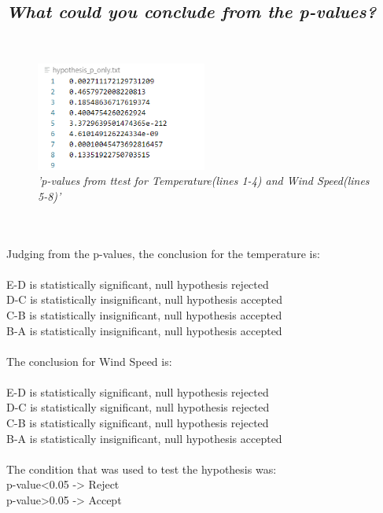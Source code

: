 \documentclass[a4paper,12pt]{article} %
\begin{document}
\subsection{\it What could you conclude from the p-values?}
\\
\begin{figure}[H]
\centering
\includegraphics[width=0.5\textwidth]{Graphs/Pvalues_95pr_ttest_TEMP_WS.PNG}
\caption{\it'p-values from ttest for Temperature(lines 1-4) and Wind Speed(lines 5-8)'}
\end{figure}
\\\\
Judging from the p-values, the conclusion for the temperature is:\\\\
E-D is statistically significant, null hypothesis rejected\\
D-C is statistically insignificant, null hypothesis accepted\\
C-B is statistically insignificant, null hypothesis accepted\\
B-A is statistically insignificant, null hypothesis accepted\\\\
The conclusion for Wind Speed is:\\\\
E-D is statistically significant, null hypothesis rejected\\
D-C is statistically significant, null hypothesis rejected\\
C-B is statistically significant, null hypothesis rejected\\
B-A is statistically insignificant, null hypothesis accepted\\\\
The condition that was used to test the hypothesis was:\\ 
p-value<0.05  ->  Reject\\
p-value>0.05  ->  Accept\\\\
\end{document}
